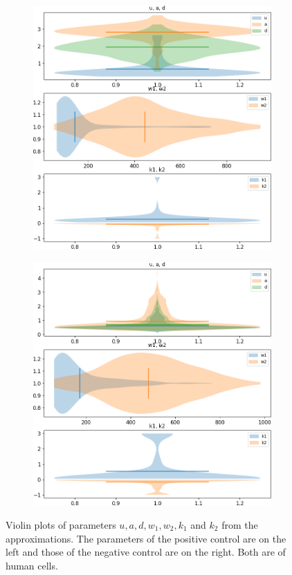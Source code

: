\begin{figure}
	\centering
	\begin{subfigure}{0.45\linewidth}
		\includegraphics[width=\textwidth]{fig/parameter_violin_plot_human_pos}
	\end{subfigure}
	\hfill
	\begin{subfigure}{0.45\linewidth}
		\includegraphics[width=\textwidth]{fig/parameter_violin_plot_human_neg}
	\end{subfigure}
	
	\caption{Violin plots of parameters $u, a, d, w_1, w_2, k_1$ and $k_2$ from the approximations. The parameters of the positive control are on the left and those of the negative control are on the right. Both are of human cells.}
	\label{fig:parameter_violin_plot}
\end{figure}


